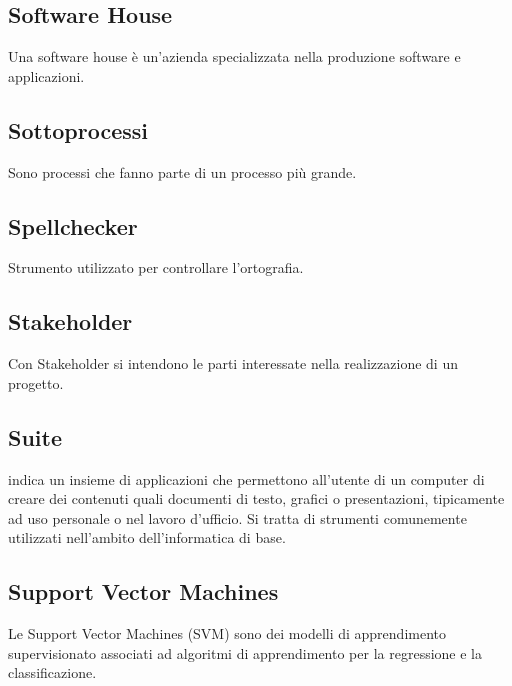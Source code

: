 \subsection*{Software House}
Una software house è un'azienda specializzata nella produzione software e applicazioni.

\subsection*{Sottoprocessi}
Sono processi che fanno parte di un processo più grande.

\subsection*{Spellchecker}
Strumento utilizzato per controllare l'ortografia.

\subsection*{Stakeholder}
Con Stakeholder si intendono le parti interessate nella realizzazione di un progetto.

\subsection*{Suite}
indica un insieme di applicazioni che permettono all'utente di un computer di creare dei contenuti quali documenti di testo, grafici o presentazioni, tipicamente ad uso personale o nel lavoro d'ufficio.
Si tratta di strumenti comunemente utilizzati nell'ambito dell'informatica di base.

\subsection*{Support Vector Machines}
Le Support Vector Machines (SVM) sono dei modelli di apprendimento supervisionato associati ad algoritmi di apprendimento per la regressione e la classificazione.


